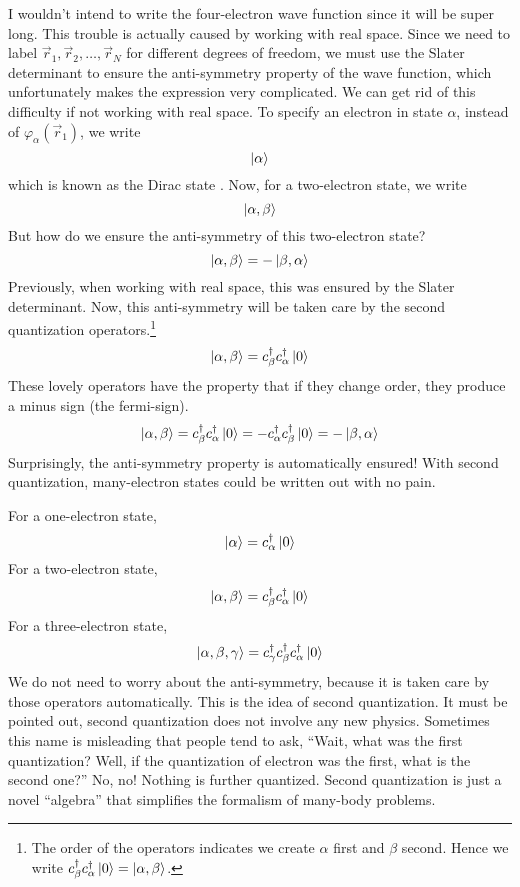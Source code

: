 %
I wouldn't intend to write the four-electron wave function since it will be super long.
This trouble is actually caused by working with real space.
Since we need to label $\vec{r}_1, \vec{r}_2, \ldots, \vec{r}_N$ for different
degrees of freedom, we must use the Slater determinant to ensure the anti-symmetry
property of the wave function, which unfortunately makes the expression very complicated.
We can get rid of this difficulty if not working with real space. To specify an electron
in state $\alpha$, instead of $\varphi_\alpha(\vec{r}_1)$, we write
\begin{equation*}
\Ket{\alpha}
\end{equation*}
%
which is known as the Dirac state \cite{QM}. Now, for a two-electron state, we write
\begin{equation*}
\Ket{\alpha, \beta}
\end{equation*}
%
But how do we ensure the anti-symmetry of this two-electron state?
\begin{equation}
\Ket{\alpha, \beta} = -\Ket{\beta, \alpha}
\end{equation}
%
Previously, when working with real space, this was ensured by the
Slater determinant. Now, this anti-symmetry will be taken care by the
second quantization operators.\footnote{The order of the operators indicates
we create $\alpha$ first and $\beta$ second. Hence we write
$c_\beta^\dagger c_\alpha^\dagger \Ket{0} = \Ket{\alpha,\beta}$.}
\begin{equation}
\Ket{\alpha, \beta} = c_\beta^\dagger c_\alpha^\dagger \Ket{0}
\end{equation}
%
These lovely operators have the property that if they change order, they produce
a minus sign (the fermi-sign).
\begin{equation}
\Ket{\alpha, \beta} = c_\beta^\dagger c_\alpha^\dagger \Ket{0} =
- c_\alpha^\dagger c_\beta^\dagger \Ket{0} = -\Ket{\beta, \alpha}
\end{equation}
%
Surprisingly, the anti-symmetry property is automatically ensured!
With second quantization, many-electron states could
be written out with no pain.

For a one-electron state,
\begin{equation}
\Ket{\alpha} = c_\alpha^\dagger \Ket{0}
\end{equation}
%
For a two-electron state,
\begin{equation}
\Ket{\alpha,\beta} = c_\beta^\dagger c_\alpha^\dagger \Ket{0}
\end{equation}
%
For a three-electron state,
\begin{equation}
\Ket{\alpha,\beta,\gamma} = c_\gamma^\dagger c_\beta^\dagger c_\alpha^\dagger \Ket{0}
\end{equation}
%
We do not need to worry about the anti-symmetry, because it is taken care by
those operators automatically. This is the idea of second quantization.
It must be pointed out, second quantization does not involve any new physics.
Sometimes this name is misleading that people tend to ask, ``Wait, what
was the first quantization? Well, if the quantization of electron was the first,
what is the second one?'' No, no! Nothing is further quantized. Second quantization
is just a novel ``algebra'' that simplifies the formalism of many-body problems.

